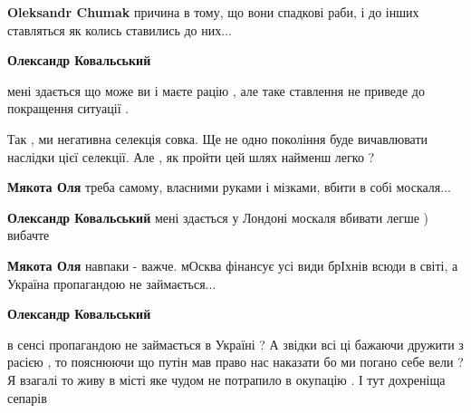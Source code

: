 \begin{itemize}
\begin{itemize}
\textbf{Oleksandr Chumak} причина в тому, що вони спадкові раби, і до інших ставляться як колись ставились до них...

 
\textbf{Олександр Ковальський} 

мені здається що може ви і маєте рацію , але таке ставлення не приведе до
покращення ситуації .

Так , ми негативна селекція совка. Ще не одно покоління буде вичавлювати
наслідки цієї селекції. Але , як пройти цей шлях найменш легко ?

 
\textbf{Мякота Оля} треба самому, власними руками і мізками, вбити в собі москаля...

 
\textbf{Олександр Ковальський} мені здається у Лондоні москаля вбивати легше ) вибачте

 
\textbf{Мякота Оля} навпаки - важче. мОсква фінансує усі види брІхнів всюди в світі, а Україна пропагандою не займається...

 
\textbf{Олександр Ковальський} 

в сенсі пропагандою не займається в Україні ? А звідки всі ці бажаючи дружити з
расією , то пояснюючи що путін мав право нас наказати бо ми погано себе вели ?
Я взагалі то живу в місті яке чудом не потрапило в окупацію . І тут дохреніща
сепарів


\end{itemize}
\end{itemize}
